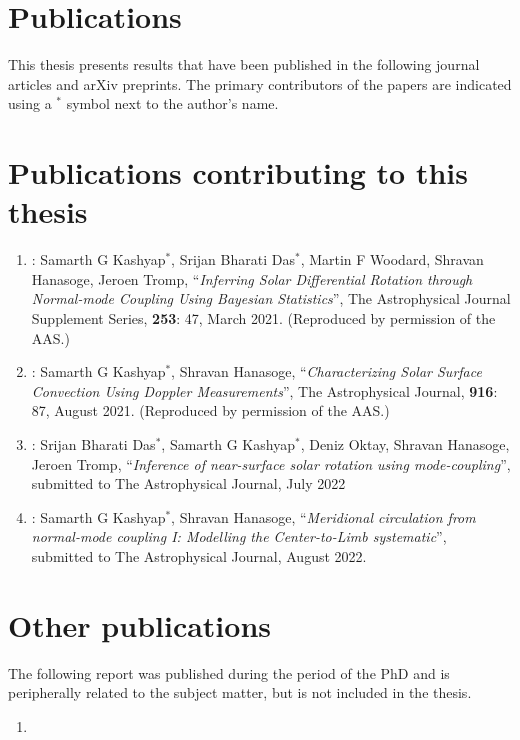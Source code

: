 \thispagestyle{plain}
\section*{Publications}
This thesis presents results that have been published in the following journal
articles and arXiv preprints. The primary contributors of the papers are indicated
using a ${}^*$ symbol next to the author's name.

\section*{Publications contributing to this thesis}
\begin{enumerate}
  \item \cite{SGK-2021-ApJS}: {\color{denimdarkblue} Samarth G Kashyap}${}^*$, 
    Srijan Bharati Das${}^*$, 
    Martin F Woodard, Shravan Hanasoge, Jeroen Tromp, 
    ``\emph{Inferring Solar Differential Rotation through Normal-mode 
    Coupling Using Bayesian Statistics}'', The Astrophysical Journal Supplement Series, 
    \textbf{253}: 47, March 2021. (Reproduced by permission of the AAS.)

  \item \cite{SGK-2021-ApJ}: {\color{denimdarkblue} Samarth G Kashyap}${}^*$,
    Shravan Hanasoge, ``\emph{Characterizing Solar Surface Convection Using 
    Doppler Measurements}'', The Astrophysical Journal, \textbf{916}: 87, 
    August 2021. (Reproduced by permission of the AAS.)

  \item \cite{SBD-2022-ApJ}: Srijan Bharati Das${}^*$, 
     {\color{denimdarkblue} Samarth G Kashyap}${}^*$, Deniz Oktay, 
     Shravan Hanasoge, Jeroen Tromp, ``\emph{Inference of near-surface solar rotation
     using mode-coupling}'', submitted to The Astrophysical Journal, July 2022

  \item \cite{SGK-2022-meridionalcirc}: {\color{denimdarkblue} Samarth G Kashyap}${}^*$, 
     Shravan Hanasoge, ``\emph{Meridional circulation from normal-mode coupling I:
     Modelling the Center-to-Limb systematic}'', submitted to The Astrophysical
     Journal, August 2022.
\end{enumerate}

\section*{Other publications}
The following report was published during the period of the PhD and is 
peripherally related to the subject matter, but is not included in the thesis.
\begin{enumerate}
   \item 
\end{enumerate}

